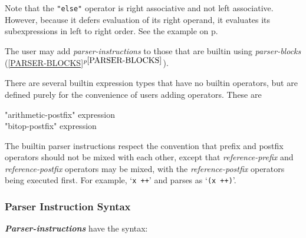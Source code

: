 \documentclass[12pt]{article}
\newcommand{\ikey}[2]{{\bf \em #1}\index{#2}}
\newcommand{\itemref}[1]{\ref{#1}$^{p\pageref{#1}}$}
\newcommand{\pagref}[1]{p\pageref{#1}}
\begin{document}
Note that the {\tt "else"} operator is right associative and not
left associative.  However, because it defers evaluation of its
right operand, it evaluates its subexpressions in left to
right order.  See the example on \pagref{IF-ELSE-EXAMPLE}.

The user may add {\em parser-instructions} to those that
are builtin using {\em parser-blocks} (\itemref{PARSER-BLOCKS}).

There are several builtin expression types that have no builtin
operators, but are defined purely for the convenience of users
adding operators.  These are
\begin{center}
"arithmetic-postfix" expression \\
"bitop-postfix" expression
\end{center}

The builtin parser instructions respect the convention that
prefix and postfix operators should not be mixed with each other,
except that {\em reference-prefix} and {\em reference-postfix}
operators may be mixed, with the {\em reference-postfix} operators
being executed first.  For example,
`{\tt * x ++}' and parses as `{\tt * (x ++)}'.

\subsubsection{Parser Instruction Syntax}
\label{PARSER-INSTRUCTION-SYNTAX}

\ikey{Parser-instructions}{parser-instruction}\label{PARSER-INSTRUCTION}
have the syntax:
\end{document}
